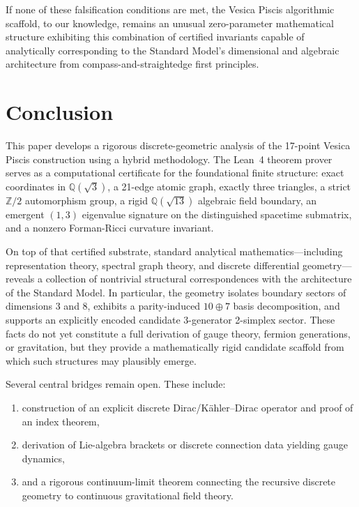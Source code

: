 \documentclass[12pt, a4paper]{article}
\begin{document}
If none of these falsification conditions are met, the Vesica Piscis algorithmic scaffold, to our knowledge, remains an unusual zero-parameter mathematical structure exhibiting this combination of certified invariants capable of analytically corresponding to the Standard Model's dimensional and algebraic architecture from compass-and-straightedge first principles.

\section{Conclusion}

This paper develops a rigorous discrete-geometric analysis of the 17-point Vesica Piscis construction using a hybrid methodology. The Lean~4 theorem prover serves as a computational certificate for the foundational finite structure: exact coordinates in $\mathbb{Q}(\sqrt{3})$, a 21-edge atomic graph, exactly three triangles, a strict $\mathbb{Z}/2$ automorphism group, a rigid $\mathbb{Q}(\sqrt{13})$ algebraic field boundary, an emergent $(1,3)$ eigenvalue signature on the distinguished spacetime submatrix, and a nonzero Forman-Ricci curvature invariant.

On top of that certified substrate, standard analytical mathematics---including representation theory, spectral graph theory, and discrete differential geometry---reveals a collection of nontrivial structural correspondences with the architecture of the Standard Model. In particular, the geometry isolates boundary sectors of dimensions 3 and 8, exhibits a parity-induced $10 \oplus 7$ basis decomposition, and supports an explicitly encoded candidate 3-generator 2-simplex sector. These facts do not yet constitute a full derivation of gauge theory, fermion generations, or gravitation, but they provide a mathematically rigid candidate scaffold from which such structures may plausibly emerge.

Several central bridges remain open. These include:
\begin{enumerate}
    \item construction of an explicit discrete Dirac/K\"ahler--Dirac operator and proof of an index theorem,
    \item derivation of Lie-algebra brackets or discrete connection data yielding gauge dynamics,
    \item and a rigorous continuum-limit theorem connecting the recursive discrete geometry to continuous gravitational field theory.
\end{enumerate}
\end{document}
